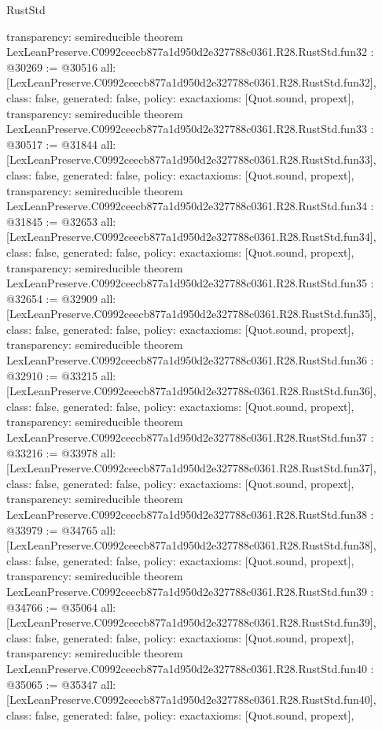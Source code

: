 \begin{lexlean}{RustStd}
\begin{coremodule}
{  transparency: semireducible
}
theorem LexLeanPreserve.C0992ceecb877a1d950d2e327788c0361.R28.RustStd.fun32 : @30269 := @30516 {
  all: [LexLeanPreserve.C0992ceecb877a1d950d2e327788c0361.R28.RustStd.fun32],
  class: false,
  generated: false,
  policy: exact{axioms: [Quot.sound, propext]},
  transparency: semireducible
}
theorem LexLeanPreserve.C0992ceecb877a1d950d2e327788c0361.R28.RustStd.fun33 : @30517 := @31844 {
  all: [LexLeanPreserve.C0992ceecb877a1d950d2e327788c0361.R28.RustStd.fun33],
  class: false,
  generated: false,
  policy: exact{axioms: [Quot.sound, propext]},
  transparency: semireducible
}
theorem LexLeanPreserve.C0992ceecb877a1d950d2e327788c0361.R28.RustStd.fun34 : @31845 := @32653 {
  all: [LexLeanPreserve.C0992ceecb877a1d950d2e327788c0361.R28.RustStd.fun34],
  class: false,
  generated: false,
  policy: exact{axioms: [Quot.sound, propext]},
  transparency: semireducible
}
theorem LexLeanPreserve.C0992ceecb877a1d950d2e327788c0361.R28.RustStd.fun35 : @32654 := @32909 {
  all: [LexLeanPreserve.C0992ceecb877a1d950d2e327788c0361.R28.RustStd.fun35],
  class: false,
  generated: false,
  policy: exact{axioms: [Quot.sound, propext]},
  transparency: semireducible
}
theorem LexLeanPreserve.C0992ceecb877a1d950d2e327788c0361.R28.RustStd.fun36 : @32910 := @33215 {
  all: [LexLeanPreserve.C0992ceecb877a1d950d2e327788c0361.R28.RustStd.fun36],
  class: false,
  generated: false,
  policy: exact{axioms: [Quot.sound, propext]},
  transparency: semireducible
}
theorem LexLeanPreserve.C0992ceecb877a1d950d2e327788c0361.R28.RustStd.fun37 : @33216 := @33978 {
  all: [LexLeanPreserve.C0992ceecb877a1d950d2e327788c0361.R28.RustStd.fun37],
  class: false,
  generated: false,
  policy: exact{axioms: [Quot.sound, propext]},
  transparency: semireducible
}
theorem LexLeanPreserve.C0992ceecb877a1d950d2e327788c0361.R28.RustStd.fun38 : @33979 := @34765 {
  all: [LexLeanPreserve.C0992ceecb877a1d950d2e327788c0361.R28.RustStd.fun38],
  class: false,
  generated: false,
  policy: exact{axioms: [Quot.sound, propext]},
  transparency: semireducible
}
theorem LexLeanPreserve.C0992ceecb877a1d950d2e327788c0361.R28.RustStd.fun39 : @34766 := @35064 {
  all: [LexLeanPreserve.C0992ceecb877a1d950d2e327788c0361.R28.RustStd.fun39],
  class: false,
  generated: false,
  policy: exact{axioms: [Quot.sound, propext]},
  transparency: semireducible
}
theorem LexLeanPreserve.C0992ceecb877a1d950d2e327788c0361.R28.RustStd.fun40 : @35065 := @35347 {
  all: [LexLeanPreserve.C0992ceecb877a1d950d2e327788c0361.R28.RustStd.fun40],
  class: false,
  generated: false,
  policy: exact{axioms: [Quot.sound, propext]},
}
\end{coremodule}
\end{lexlean}
